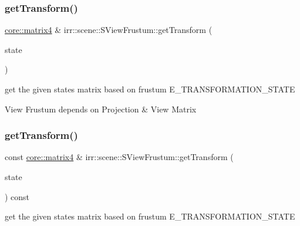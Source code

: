 \subsubsection{\texorpdfstring{get\+Transform()}{getTransform()}\hspace{0.1cm}{\footnotesize\ttfamily [1/2]}}
{\footnotesize\ttfamily \hyperlink{namespaceirr_1_1core_a73fa92e638c5ca97efd72da307cc9b65}{core\+::matrix4} \& irr\+::scene\+::\+S\+View\+Frustum\+::get\+Transform (\begin{DoxyParamCaption}\item[{\hyperlink{namespaceirr_1_1video_a15b57657a320243be03ae6f66fcff43d}{video\+::\+E\+\_\+\+T\+R\+A\+N\+S\+F\+O\+R\+M\+A\+T\+I\+O\+N\+\_\+\+S\+T\+A\+TE}}]{state }\end{DoxyParamCaption})\hspace{0.3cm}{\ttfamily [inline]}}



get the given state\textquotesingle{}s matrix based on frustum E\+\_\+\+T\+R\+A\+N\+S\+F\+O\+R\+M\+A\+T\+I\+O\+N\+\_\+\+S\+T\+A\+TE 

View Frustum depends on Projection \& View Matrix \mbox{\label{structirr_1_1scene_1_1SViewFrustum_a9afbd4a90f330de3fde6b534da3920f8}} 
\subsubsection{\texorpdfstring{get\+Transform()}{getTransform()}\hspace{0.1cm}{\footnotesize\ttfamily [2/2]}}
{\footnotesize\ttfamily const \hyperlink{namespaceirr_1_1core_a73fa92e638c5ca97efd72da307cc9b65}{core\+::matrix4} \& irr\+::scene\+::\+S\+View\+Frustum\+::get\+Transform (\begin{DoxyParamCaption}\item[{\hyperlink{namespaceirr_1_1video_a15b57657a320243be03ae6f66fcff43d}{video\+::\+E\+\_\+\+T\+R\+A\+N\+S\+F\+O\+R\+M\+A\+T\+I\+O\+N\+\_\+\+S\+T\+A\+TE}}]{state }\end{DoxyParamCaption}) const\hspace{0.3cm}{\ttfamily [inline]}}



get the given state\textquotesingle{}s matrix based on frustum E\+\_\+\+T\+R\+A\+N\+S\+F\+O\+R\+M\+A\+T\+I\+O\+N\+\_\+\+S\+T\+A\+TE 

